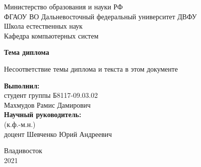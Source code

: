 \documentclass[a4paper,12pt]{article}
\begin{document}
	\begin{titlepage}
		\begin{center}
			Министерство образования и науки РФ\\
			ФГАОУ ВО Дальневосточный федеральный университет \flqq ДВФУ\frqq\\
			Школа естественных наук\\
			Кафедра компьютерных систем\\
		\end{center}
		\vspace{5cm}
		\begin{center}
			\LARGE\bf{Тема диплома}
		\end{center}
		\begin{center}\large
			Несоответствие темы диплома и текста в этом документе
		\end{center}
		\vspace{3cm}
		\large
		\begin{flushright}
			\textbf{Выполнил:}\\
			студент группы Б8117-09.03.02\\
			Махмудов Рамис Дамирович\\
			\vspace{1cm}
			\textbf{Научный руководитель:}\\
			(к.ф.-м.н.) \\
			доцент Шевченко Юрий Андреевич
		\end{flushright}
		\vspace{1cm}
		\begin{center}
			Владивосток\\2021
		\end{center}
	\end{titlepage}
	\tableofcontents
\newpage

	\newpage
	\newpage
\end{document}
